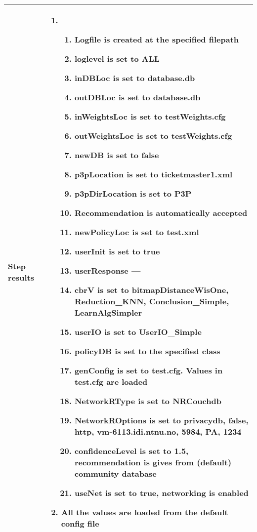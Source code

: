 \documentclass[10pt]{article}
\begin{document}
\begin{center}
\begin{longtable}{ | p{4cm} | p{10cm} | }
			Step results & 	\begin{enumerate}
							\item
							\begin{enumerate}
								\item Logfile is created at the specified filepath
								\item loglevel is set to ALL
								\item inDBLoc is set to database.db
								\item outDBLoc is set to database.db
								\item inWeightsLoc is set to testWeights.cfg
								\item outWeightsLoc is set to testWeights.cfg
								\item newDB is set to false
								\item p3pLocation is set to ticketmaster1.xml
								\item p3pDirLocation is set to P3P
								\item Recommendation is automatically accepted
								\item newPolicyLoc is set to test.xml
								\item userInit is set to true
								\item userResponse ---
								\item cbrV is set to bitmapDistanceWisOne, Reduction_KNN, Conclusion_Simple, LearnAlgSimpler
								\item userIO is set to UserIO_Simple
								\item policyDB is set to the specified class
								\item genConfig is set to test.cfg. Values in test.cfg are loaded
								\item NetworkRType is set to NRCouchdb
								\item NetworkROptions is set to privacydb, false, http, vm-6113.idi.ntnu.no, 5984, PA, 1234
								\item confidenceLevel is set to 1.5, recommendation is gives from (default) community database
								\item useNet is set to true, networking is enabled
							\end{enumerate}
							\item All the values are loaded from the default config file
						\end{enumerate} \\ [3pt] \hline


\end{longtable}
\end{center}
\end{document}

